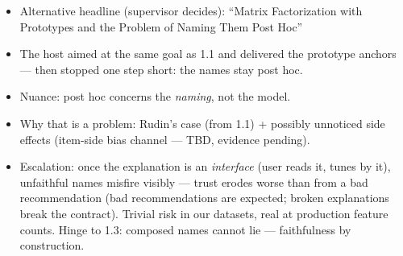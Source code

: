 \begin{itemize}
    \item[SQ-1] Alternative headline (supervisor decides): ``Matrix Factorization with Prototypes and the Problem of Naming Them Post Hoc''
    \item The host aimed at the same goal as 1.1 and delivered the prototype anchors — then stopped one step short: the names stay post hoc.
    \item Nuance: post hoc concerns the \emph{naming}, not the model.
    \item Why that is a problem: Rudin's case (from 1.1) + possibly unnoticed side effects (item-side bias channel — TBD, evidence pending).
    \item Escalation: once the explanation is an \emph{interface} (user reads it, tunes by it), unfaithful names misfire visibly — trust erodes worse than from a bad recommendation (bad recommendations are expected; broken explanations break the contract). Trivial risk in our datasets, real at production feature counts. Hinge to 1.3: composed names cannot lie — faithfulness by construction.

\end{itemize}
